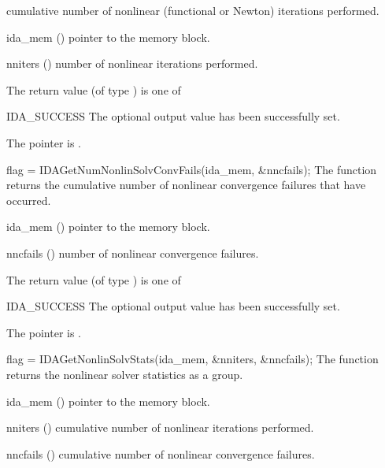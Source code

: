 {{  cumulative number of nonlinear (functional or Newton) iterations performed. 
}
{
  \begin{args}[nniters]
  \item[ida\_mem] ()
    pointer to the {\idas} memory block.
  \item[nniters] ()
    number of nonlinear iterations performed.
  \end{args}
}
{
  The return value  (of type ) is one of
  \begin{args}
  \item[IDA\_SUCCESS] 
    The optional output value has been successfully set.
  \item[\Id{IDA\_MEM\_NULL}]
    The  pointer is .
  \end{args}
}
{}
{
  flag = IDAGetNumNonlinSolvConvFails(ida\_mem, \&nncfails);
}
{
  The function  returns the
  cumulative number of nonlinear convergence failures that have occurred.
}
{
  \begin{args}[nncfails]
  \item[ida\_mem] ()
    pointer to the {\idas} memory block.
  \item[nncfails] ()
    number of nonlinear convergence failures.
  \end{args}
}
{
  The return value  (of type ) is one of
  \begin{args}
  \item[IDA\_SUCCESS] 
    The optional output value has been successfully set.
  \item[\Id{IDA\_MEM\_NULL}]
    The  pointer is .
  \end{args}
}
{}
{
  flag = IDAGetNonlinSolvStats(ida\_mem, \&nniters, \&nncfails);
}
{
  The function  returns the
  {\idas} nonlinear solver statistics as a group.
}
{
  \begin{args}[nncfails]
  \item[ida\_mem] ()
    pointer to the {\idas} memory block.
  \item[nniters] ()
    cumulative number of nonlinear iterations performed.
  \item[nncfails] ()
    cumulative number of nonlinear convergence failures.
  \end{args}
}
{
}}
